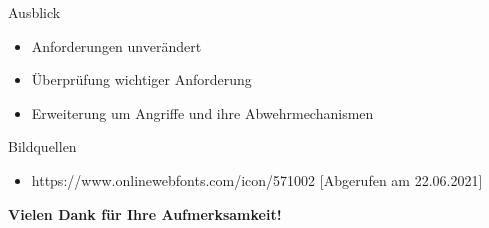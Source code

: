 \documentclass{beamer}
\begin{document}
\begin{frame}{Ausblick}
    \begin{itemize}
        \item Anforderungen unverändert
        \item Überprüfung wichtiger Anforderung
        \item Erweiterung um Angriffe und ihre Abwehrmechanismen
    \end{itemize}
\end{frame}

\begin{frame}{Bildquellen}
    \begin{itemize}
        \tiny
        \item https://www.onlinewebfonts.com/icon/571002 [Abgerufen am 22.06.2021]
    \end{itemize}
\end{frame}

\begin{frame}
    \begin{center}
        \textbf{Vielen Dank für Ihre Aufmerksamkeit!}
    \end{center}
\end{frame}
\end{document}
